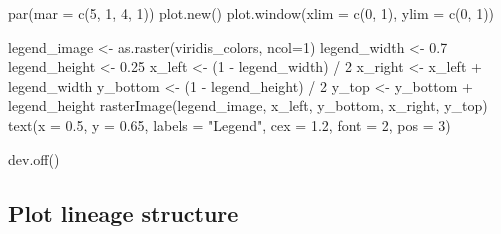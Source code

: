 \documentclass[
  letterpaper,
  DIV=11,
  numbers=noendperiod]{scrreprt}
\newenvironment{Shaded}{\begin{snugshade}}{\end{snugshade}}
\newcommand{\AttributeTok}[1]{\textcolor[rgb]{0.40,0.45,0.13}{#1}}
\newcommand{\DecValTok}[1]{\textcolor[rgb]{0.68,0.00,0.00}{#1}}
\newcommand{\FloatTok}[1]{\textcolor[rgb]{0.68,0.00,0.00}{#1}}
\newcommand{\FunctionTok}[1]{\textcolor[rgb]{0.28,0.35,0.67}{#1}}
\newcommand{\NormalTok}[1]{\textcolor[rgb]{0.00,0.23,0.31}{#1}}
\newcommand{\OtherTok}[1]{\textcolor[rgb]{0.00,0.23,0.31}{#1}}
\newcommand{\SpecialCharTok}[1]{\textcolor[rgb]{0.37,0.37,0.37}{#1}}
\newcommand{\StringTok}[1]{\textcolor[rgb]{0.13,0.47,0.30}{#1}}
\begin{document}
\begin{Shaded}
\begin{Highlighting}[]
\FunctionTok{par}\NormalTok{(}\AttributeTok{mar =} \FunctionTok{c}\NormalTok{(}\DecValTok{5}\NormalTok{, }\DecValTok{1}\NormalTok{, }\DecValTok{4}\NormalTok{, }\DecValTok{1}\NormalTok{)) }
\FunctionTok{plot.new}\NormalTok{() }
\FunctionTok{plot.window}\NormalTok{(}\AttributeTok{xlim =} \FunctionTok{c}\NormalTok{(}\DecValTok{0}\NormalTok{, }\DecValTok{1}\NormalTok{), }\AttributeTok{ylim =} \FunctionTok{c}\NormalTok{(}\DecValTok{0}\NormalTok{, }\DecValTok{1}\NormalTok{))}

\NormalTok{legend\_image }\OtherTok{\textless{}{-}} \FunctionTok{as.raster}\NormalTok{(viridis\_colors, }\AttributeTok{ncol=}\DecValTok{1}\NormalTok{)}
\NormalTok{legend\_width }\OtherTok{\textless{}{-}} \FloatTok{0.7}
\NormalTok{legend\_height }\OtherTok{\textless{}{-}} \FloatTok{0.25}
\NormalTok{x\_left }\OtherTok{\textless{}{-}}\NormalTok{ (}\DecValTok{1} \SpecialCharTok{{-}}\NormalTok{ legend\_width) }\SpecialCharTok{/} \DecValTok{2}
\NormalTok{x\_right }\OtherTok{\textless{}{-}}\NormalTok{ x\_left }\SpecialCharTok{+}\NormalTok{ legend\_width}
\NormalTok{y\_bottom }\OtherTok{\textless{}{-}}\NormalTok{ (}\DecValTok{1} \SpecialCharTok{{-}}\NormalTok{ legend\_height) }\SpecialCharTok{/} \DecValTok{2}
\NormalTok{y\_top }\OtherTok{\textless{}{-}}\NormalTok{ y\_bottom }\SpecialCharTok{+}\NormalTok{ legend\_height}
\FunctionTok{rasterImage}\NormalTok{(legend\_image, x\_left, y\_bottom, x\_right, y\_top)}
\FunctionTok{text}\NormalTok{(}\AttributeTok{x =} \FloatTok{0.5}\NormalTok{, }\AttributeTok{y =} \FloatTok{0.65}\NormalTok{, }\AttributeTok{labels =} \StringTok{"Legend"}\NormalTok{, }\AttributeTok{cex =} \FloatTok{1.2}\NormalTok{, }\AttributeTok{font =} \DecValTok{2}\NormalTok{, }\AttributeTok{pos =} \DecValTok{3}\NormalTok{)}

\FunctionTok{dev.off}\NormalTok{()}
\end{Highlighting}
\end{Shaded}

\subsection{Plot lineage structure}\label{plot-lineage-structure}
\end{document}
